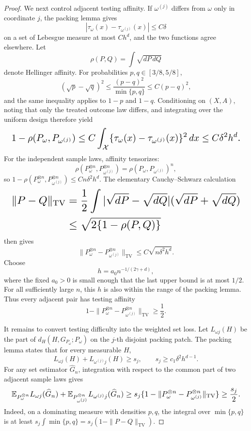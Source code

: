 \documentclass{article}
\begin{document}
\begin{proof}
We next control adjacent testing affinity. If \(\omega^{(j)}\) differs from \(\omega\) only in coordinate \(j\), the packing lemma gives
\[
|\tau_\omega(x)-\tau_{\omega^{(j)}}(x)|\le C\delta
\]
on a set of Lebesgue measure at most \(Ch^d\), and the two functions agree elsewhere. Let
\[
\rho(P,Q)=\int\sqrt{dP\,dQ}
\]
denote Hellinger affinity. For probabilities \(p,q\in[3/8,5/8]\),
\[
(\sqrt p-\sqrt q)^2\le\frac{(p-q)^2}{\min\{p,q\}}\le C(p-q)^2,
\]
and the same inequality applies to \(1-p\) and \(1-q\). Conditioning on \((X,A)\), noting that only the treated outcome law differs, and integrating over the uniform design therefore yield
\[
\makebox[\linewidth][c]{\resizebox{0.98\linewidth}{!}{\(\displaystyle 1-\rho(P_\omega,P_{\omega^{(j)}})
\le C\int_{\mathcal X}
\{\tau_\omega(x)-\tau_{\omega^{(j)}}(x)\}^2\,dx
\le C\delta^2h^d.\)}}
\]
For the independent sample laws, affinity tensorizes:
\[
\rho(P_\omega^{\otimes n},P_{\omega^{(j)}}^{\otimes n})
=\rho(P_\omega,P_{\omega^{(j)}})^n,
\]
so \(1-\rho(P_\omega^{\otimes n},P_{\omega^{(j)}}^{\otimes n})\le Cn\delta^2h^d\). The elementary Cauchy--Schwarz calculation
\[
\makebox[\linewidth][c]{\resizebox{0.98\linewidth}{!}{\(\displaystyle \begin{aligned}
\|P-Q\|_{\mathrm{TV}}
&=\frac12\int|\sqrt{dP}-\sqrt{dQ}|(\sqrt{dP}+\sqrt{dQ})\\
&\le\sqrt{2\{1-\rho(P,Q)\}}
\end{aligned}\)}}
\]
then gives
\[
\|P_\omega^{\otimes n}-P_{\omega^{(j)}}^{\otimes n}\|_{\mathrm{TV}}
\le C\sqrt{n\delta^2h^d}.
\]
Choose
\[
h=a_0n^{-1/(2\gamma+d)},
\]
where the fixed \(a_0>0\) is small enough that the last upper bound is at most \(1/2\). For all sufficiently large \(n\), this \(h\) is also within the range of the packing lemma. Thus every adjacent pair has testing affinity
\[
1-\|P_\omega^{\otimes n}-P_{\omega^{(j)}}^{\otimes n}\|_{\mathrm{TV}}
\ge\frac12.
\]

It remains to convert testing difficulty into the weighted set loss. Let \(L_{\omega j}(H)\) be the part of \(d_H(H,G_{P_\omega};P_\omega)\) on the \(j\)-th disjoint packing patch. The packing lemma states that for every measurable \(H\),
\[
L_{\omega j}(H)+L_{\omega^{(j)}j}(H)
\ge s_j,
\qquad s_j\ge c_1\delta^2h^{d-1}.
\]
For any set estimator \(\widehat G_n\), integration with respect to the common part of two adjacent sample laws gives
\[
\makebox[\linewidth][c]{\resizebox{0.98\linewidth}{!}{\(\displaystyle \mathbb E_{P_\omega^{\otimes n}}L_{\omega j}(\widehat G_n)
+\mathbb E_{P_{\omega^{(j)}}^{\otimes n}}L_{\omega^{(j)}j}(\widehat G_n)
\ge s_j\{1-\|P_\omega^{\otimes n}-P_{\omega^{(j)}}^{\otimes n}\|_{\mathrm{TV}}\}
\ge\frac{s_j}{2}.\)}}
\]
Indeed, on a dominating measure with densities \(p,q\), the integral over \(\min\{p,q\}\) is at least \(s_j\int\min\{p,q\}=s_j(1-\|P-Q\|_{\mathrm{TV}})\).


\end{proof}
\end{document}
